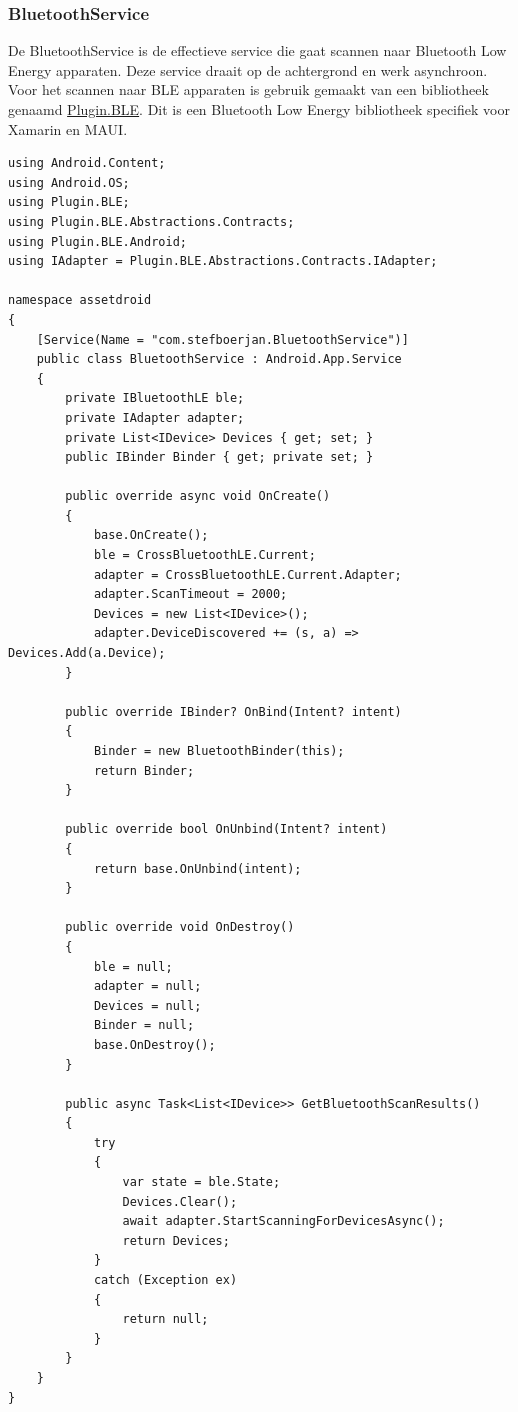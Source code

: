 \subsubsection{BluetoothService}
De BluetoothService is de effectieve service die gaat scannen naar Bluetooth Low Energy apparaten. Deze service draait op de achtergrond en werk asynchroon. Voor het scannen naar BLE apparaten is gebruik gemaakt van een bibliotheek genaamd \href{https://github.com/dotnet-bluetooth-le/dotnet-bluetooth-le}{Plugin.BLE}. Dit is een Bluetooth Low Energy bibliotheek specifiek voor Xamarin en MAUI.  
\begin{lstlisting}
using Android.Content;
using Android.OS;
using Plugin.BLE;
using Plugin.BLE.Abstractions.Contracts;
using Plugin.BLE.Android;
using IAdapter = Plugin.BLE.Abstractions.Contracts.IAdapter;

namespace assetdroid
{
    [Service(Name = "com.stefboerjan.BluetoothService")]
    public class BluetoothService : Android.App.Service
    {
        private IBluetoothLE ble;
        private IAdapter adapter;
        private List<IDevice> Devices { get; set; }
        public IBinder Binder { get; private set; }
        
        public override async void OnCreate()
        {
            base.OnCreate();
            ble = CrossBluetoothLE.Current;
            adapter = CrossBluetoothLE.Current.Adapter;
            adapter.ScanTimeout = 2000;
            Devices = new List<IDevice>();
            adapter.DeviceDiscovered += (s, a) => Devices.Add(a.Device);
        }
        
        public override IBinder? OnBind(Intent? intent)
        {
            Binder = new BluetoothBinder(this);
            return Binder;
        }
        
        public override bool OnUnbind(Intent? intent)
        {
            return base.OnUnbind(intent);
        }
        
        public override void OnDestroy()
        {
            ble = null;
            adapter = null;
            Devices = null;
            Binder = null;
            base.OnDestroy();
        }
        
        public async Task<List<IDevice>> GetBluetoothScanResults()
        {
            try
            {
                var state = ble.State;
                Devices.Clear();
                await adapter.StartScanningForDevicesAsync();
                return Devices;
            }
            catch (Exception ex)
            {
                return null;
            }
        }
    }
}
\end{lstlisting}